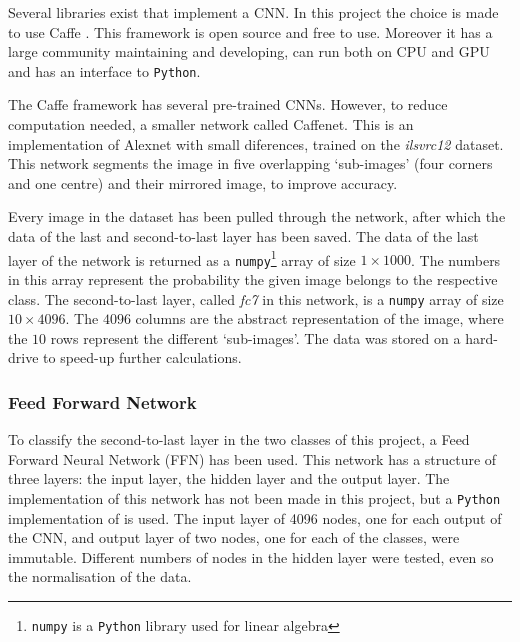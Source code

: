 Several libraries exist that implement a CNN.
In this project the choice is made to use Caffe \citep{jia2014caffe}.
This framework is open source and free to use.
Moreover it has a large community maintaining and developing, can run both on CPU and GPU and has an interface to \texttt{Python}.

The Caffe framework has several pre-trained CNNs.%
However, to reduce computation needed, a smaller network called Caffenet.
This is an implementation of Alexnet \citet{krizhevsky2012imagenet} with small diferences, trained on the \textit{ilsvrc12} dataset. \citeneed
This network segments the image in five overlapping `sub-images' (four corners and one centre) and their mirrored image, to improve accuracy.

Every image in the dataset has been pulled through the network, after which the data of the last and second-to-last layer has been saved.
The data of the last layer of the network is returned as a \texttt{numpy}\footnote{\texttt{numpy} is a \texttt{Python} library used for linear algebra} array of size $1\times1000$.
The numbers in this array represent the probability the given image belongs to the respective class.
The second-to-last layer, called \textit{fc7} in this network, is a \texttt{numpy} array of size $10\times4096$.
The $4096$ columns are the abstract representation of the image, where the $10$ rows represent the different `sub-images'.
The data was stored on a hard-drive to speed-up further calculations.


\subsubsection{Feed Forward Network}
\label{sec:Method-FFN}
To classify the second-to-last layer in the two classes of this project, a Feed Forward Neural Network (FFN) has been used.
This network has a structure of three layers: the input layer, the hidden layer and the output layer.
The implementation of this network has not been made in this project, but a \texttt{Python} implementation of \citeneed is used.
The input layer of 4096 nodes, one for each output of the CNN, and output layer of two nodes, one for each of the classes, were immutable.
Different numbers of nodes in the hidden layer were tested, even so the normalisation of the data.


